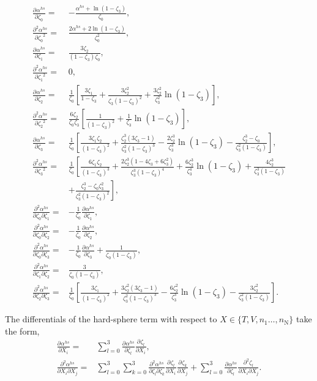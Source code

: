 \documentclass[english]{../thermomemo/thermomemo}
\newcommand*{\pd}[3][]{\frac{\partial^{#1}#2}{\partial{#3}^{#1}}}%
\newcommand*{\pdc}[3]{\frac{\partial^{2}#1}{\partial{#2}\partial{#3}}}%
\newcommand*{\lb}{\left(}
\newcommand*{\rb}{\right)}
\newcommand{\z}{\zeta}
\newcommand{\nc}{\ensuremath{\text{N}}\xspace}
\begin{document}
\begin{align}
  \pd{\alpha^{hs}}{\z_0} =&  -\frac{\alpha^{hs} + \ln(1-\z_3)}{\z_0},\\
  \pd[2]{\alpha^{hs}}{\z_0} =&  \frac{2\alpha^{hs} + 2\ln(1-\z_3)}{\z_0^2},\\
  \pd{\alpha^{hs}}{\z_1} =&  \frac{3\z_2}{\lb 1-\z_3 \rb \z_0},\\
  \pd[2]{\alpha^{hs}}{\z_1} =&  0,\\
  \pd{\alpha^{hs}}{\z_2} =& \frac{1}{\z_0} \left[ \frac{3\z_1}{1-\z_3} + \frac{3\z_2^2}{\z_3(1-\z_3)^2} + \frac{3\z_2^2}{\z_3^2} \ln(1-\z_3)\right],\\
  \pd[2]{\alpha^{hs}}{\z_2} =&  \frac{6\z_2}{\z_0\z_3} \left[ \frac{1}{(1-\z_3)^2} + \frac{1}{\z_3} \ln(1-\z_3)\right],\\
  \pd{\alpha^{hs}}{\z_3} =&  \frac{1}{\z_0} \left[ \frac{3\z_1\z_2}{\lb 1-\z_3 \rb^2} +  \frac{\z_2^3 \lb 3 \z_3 - 1 \rb}{\z_3^2(1-\z_3)^3} - \frac{2\z_2^3}{\z_3^3}\ln(1-\z_3) - \frac{\z_2^3 - \z_0}{\z_3^2\lb 1-\z_3 \rb} \right],\\
  \pd[2]{\alpha^{hs}}{\z_3} =&  \frac{1}{\z_0} \left[ \frac{6\z_1\z_2}{\lb 1-\z_3 \rb^3} +  \frac{2 \z_2^3 \lb 1 - 4 \z_3 + 6 \z_3^2 \rb}{\z_3^3(1-\z_3)^4} + \frac{6\z_2^3}{\z_3^4}\ln(1-\z_3) + \frac{4\z_2^3}{\z_3^3 \lb 1-\z_3 \rb} \right. \nonumber \\ & \left.  + \frac{\z_2^3 - \z_0\z_3^2}{\z_3^2\lb 1-\z_3 \rb^2} \right],\\
  \pdc{\alpha^{hs}}{\z_0}{\z_1} =&  -\frac{1}{\z_0}\pd{\alpha^{hs}}{\z_1},\\
  \pdc{\alpha^{hs}}{\z_0}{\z_2} =&  -\frac{1}{\z_0}\pd{\alpha^{hs}}{\z_2} ,\\
  \pdc{\alpha^{hs}}{\z_0}{\z_3} =&  -\frac{1}{\z_0}\pd{\alpha^{hs}}{\z_3} + \frac{1}{\z_0\lb 1-\z_3 \rb} ,\\
  \pdc{\alpha^{hs}}{\z_1}{\z_2} =&  \frac{3}{\z_0\lb 1-\z_3\rb} ,\\
  \pdc{\alpha^{hs}}{\z_2}{\z_3} =&  \frac{1}{\z_0} \left[ \frac{3\z_1}{\lb 1-\z_3 \rb^2} +  \frac{3\z_2^2 \lb 3 \z_3 - 1 \rb}{\z_3^2(1-\z_3)^3} - \frac{6\z_2^2}{\z_3^3}\ln(1-\z_3) - \frac{3\z_2^2}{\z_3^2\lb 1-\z_3 \rb} \right].
\end{align}

The differentials of the hard-sphere term with respect to $X \in \{T, V, n_1 \dots, n_\nc \}$ take the form,
\begin{align}
  \pd{\alpha^{hs}}{X_i} =&  \sum_{l=0}^3\pd{\alpha^{hs}}{\z_l}\pd{\z_l}{X_i},\\
  \pdc{\alpha^{hs}}{X_i}{X_j} =&  \sum_{l=0}^3\sum_{k=0}^3\pdc{\alpha^{hs}}{\z_l}{\z_k}\pd{\z_l}{X_i}\pd{\z_k}{X_j} + \sum_{l=0}^3\pd{\alpha^{hs}}{\z_l}\pdc{\z_l}{X_i}{X_j} .
\end{align}
\end{document}
